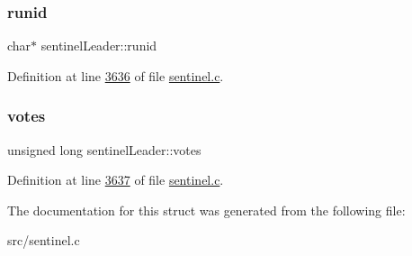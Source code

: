 \subsubsection{\texorpdfstring{runid}{runid}}
{\footnotesize\ttfamily char$\ast$ sentinel\+Leader\+::runid}



Definition at line \hyperlink{sentinel_8c_source_l03636}{3636} of file \hyperlink{sentinel_8c_source}{sentinel.\+c}.

\mbox{\label{structsentinelLeader_ad9d9dc12f2d43bb190e65e09b433a804}} 
\subsubsection{\texorpdfstring{votes}{votes}}
{\footnotesize\ttfamily unsigned long sentinel\+Leader\+::votes}



Definition at line \hyperlink{sentinel_8c_source_l03637}{3637} of file \hyperlink{sentinel_8c_source}{sentinel.\+c}.



The documentation for this struct was generated from the following file\+:\begin{DoxyCompactItemize}
\item 
src/sentinel.\+c\end{DoxyCompactItemize}
